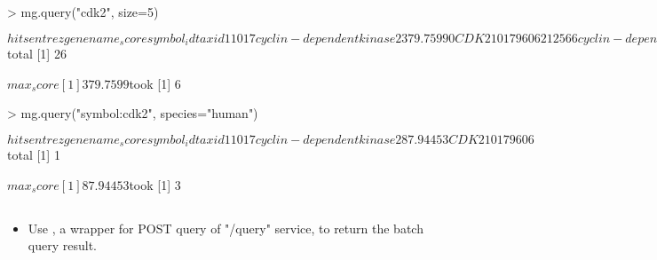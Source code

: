 \documentclass[12pt]{article}
\begin{document}
\begin{Schunk}
\begin{Sinput}
> mg.query("cdk2", size=5)
\end{Sinput}
\begin{Soutput}
$hits
  entrezgene                             name    _score  symbol    _id taxid
1       1017        cyclin-dependent kinase 2 379.75990    CDK2   1017  9606
2      12566        cyclin-dependent kinase 2 356.01750    Cdk2  12566 10090
3     362817        cyclin dependent kinase 2 269.50705    Cdk2 362817 10116
4      52004        CDK2-associated protein 2  20.39899 Cdk2ap2  52004 10090
5     143384 CDK2-associated, cullin domain 1  19.44991  CACUL1 143384  9606

$total
[1] 26

$max_score
[1] 379.7599

$took
[1] 6
\end{Soutput}
\end{Schunk}



\begin{Schunk}
\begin{Sinput}
> mg.query("symbol:cdk2", species="human")
\end{Sinput}
\begin{Soutput}
$hits
  entrezgene                      name   _score symbol  _id taxid
1       1017 cyclin-dependent kinase 2 87.94453   CDK2 1017  9606

$total
[1] 1

$max_score
[1] 87.94453

$took
[1] 3
\end{Soutput}
\end{Schunk}

\subsection{}

\begin{itemize}
\item Use , a wrapper for POST query of "/query" service, to return  the batch query result.
\end{itemize}
\end{document}
